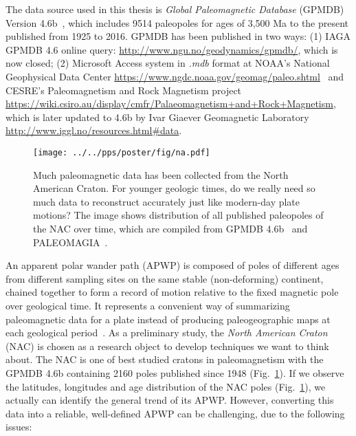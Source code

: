 The data source used in this thesis is \emph{Global Paleomagnetic
Database} (GPMDB) Version 4.6b~\cite[updated in 2016 by the Ivar Giaever
Geomagnetic Laboratory team, in collaboration with Pisarevsky]{M96,P05}, which
includes 9514 paleopoles for ages of 3,500 Ma to the present published from 1925
to 2016. GPMDB has been published in two ways: (1) IAGA GPMDB 4.6 online query:
\url{http://www.ngu.no/geodynamics/gpmdb/}, which is now closed; (2) Microsoft
Access system in \emph{.mdb} format at NOAA's National Geophysical Data Center
\url{https://www.ngdc.noaa.gov/geomag/paleo.shtml}~\citep{P03}
and CESRE's Paleomagnetism and Rock Magnetism project
\url{https://wiki.csiro.au/display/cmfr/Palaeomagnetism+and+Rock+Magnetism},
which is later updated to 4.6b by Ivar Giaever Geomagnetic Laboratory
\url{http://www.iggl.no/resources.html\#data}.

\begin{figure}[!ht]
  \centering
  \texttt{[image: ../../pps/poster/fig/na.pdf]}
  \captionsetup{width=1\textwidth}
  \caption[All published paleomagnetic data from North America]{Much
paleomagnetic data has been collected from the North American Craton. For
younger geologic times, do we really need so much data to reconstruct accurately
just like modern-day plate motions? The image shows distribution of all
published paleopoles of the NAC over time, which are compiled from GPMDB
4.6b~\citep{P05} and PALEOMAGIA~\citep{V14}.}\label{Fig:chap_intro_nacpole}
\end{figure}

An apparent polar wander path (APWP) is composed of poles of different ages
from different sampling sites on the same stable (non-deforming) continent,
chained together to form a record of motion relative to the fixed magnetic pole
over geological time. It represents a convenient way of summarizing
paleomagnetic data for a plate instead of producing paleogeographic maps at
each geological period~\citep{T08}. As a preliminary study, the \emph{North
American Craton} (NAC) is chosen as a research object to develop techniques we
want to think about. The NAC is one of best studied cratons in paleomagnetism
with the GPMDB 4.6b containing 2160 poles published since 1948
(Fig.~\ref{Fig:chap_intro_nacpole}). If we observe the latitudes, longitudes and
age distribution of the NAC poles (Fig.~\ref{Fig:chap_intro_nacpole}), we
actually can identify the general trend of its APWP\@. However, converting this
data into a reliable, well-defined APWP can be challenging, due to the following
issues:

